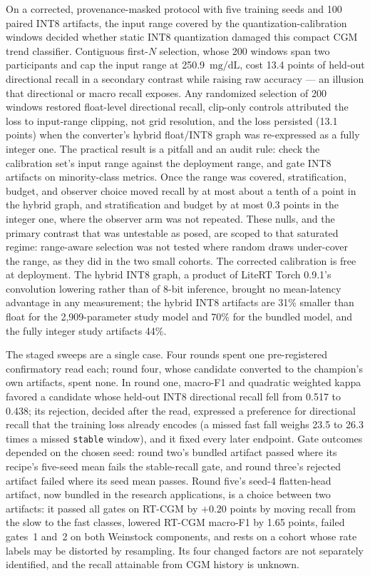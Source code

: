 \documentclass[10pt,twocolumn]{article}
\newcommand{\mgdl}{\ensuremath{\mathrm{mg/dL}}}
\begin{document}
On a corrected, provenance-masked protocol with five training seeds and
100 paired INT8 artifacts, the input range covered by the
quantization-calibration windows decided whether static INT8 quantization
damaged this compact CGM trend classifier. Contiguous first-$N$
selection, whose 200 windows span two participants and cap the input
range at 250.9~\mgdl, cost 13.4 points of held-out directional recall in a
secondary contrast while raising raw accuracy --- an illusion that
directional or macro recall exposes. Any randomized selection of 200
windows restored float-level directional recall, clip-only controls
attributed the loss to input-range clipping, not grid resolution, and the
loss persisted (13.1 points) when the converter's hybrid float/INT8 graph
was re-expressed as a fully integer one. The practical result is a
pitfall and an audit rule: check the calibration set's input range against
the deployment range, and gate INT8 artifacts on minority-class metrics.
Once the range was covered, stratification, budget, and observer choice
moved recall by at most about a tenth of a point in the hybrid graph, and
stratification and budget by at most 0.3 points in the integer one, where
the observer arm was not repeated. These nulls, and the primary contrast that
was untestable as posed, are scoped to that saturated regime: range-aware
selection was not tested where random draws under-cover the range, as they
did in the two small cohorts. The corrected calibration is free at
deployment. The hybrid INT8 graph, a product of LiteRT Torch 0.9.1's
convolution lowering rather than of 8-bit inference, brought no
mean-latency advantage in any measurement; the hybrid INT8 artifacts are
31\% smaller than float for the 2,909-parameter study model and 70\% for
the bundled model, and the fully integer study artifacts 44\%.

The staged sweeps are a single case. Four rounds spent one pre-registered
confirmatory read each; round four, whose candidate converted to the
champion's own artifacts, spent none. In round one, macro-F1 and
quadratic weighted kappa favored a candidate whose held-out INT8
directional recall fell from 0.517 to 0.438; its rejection, decided after
the read, expressed a preference for directional recall that the training
loss already encodes (a missed fast fall weighs 23.5 to 26.3 times a
missed \texttt{stable} window), and it fixed every later endpoint. Gate
outcomes depended on the chosen seed: round two's bundled artifact passed
where its recipe's five-seed mean fails the stable-recall gate, and round
three's rejected artifact failed where its seed mean passes. Round five's
seed-4 flatten-head artifact, now bundled in the research applications,
is a choice between two artifacts: it passed all gates on RT-CGM by
$+0.20$ points by moving recall from the slow to the fast classes, lowered
RT-CGM macro-F1 by 1.65 points, failed gates~1 and~2 on both Weinstock
components, and rests on a cohort whose rate labels may be distorted by
resampling. Its four changed factors are not separately identified, and
the recall attainable from CGM history is unknown.
\end{document}
